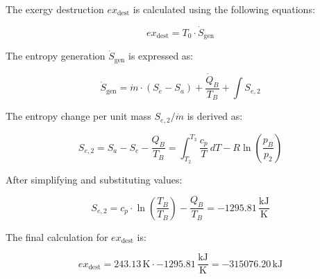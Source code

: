 The exergy destruction \( ex_{\text{dest}} \) is calculated using the following equations:

\[
ex_{\text{dest}} = T_0 \cdot \dot{S}_{\text{gen}}
\]

The entropy generation \( \dot{S}_{\text{gen}} \) is expressed as:

\[
\dot{S}_{\text{gen}} = \dot{m} \cdot (S_e - S_a) + \frac{\dot{Q}_B}{T_B} + \int S_{e,2}
\]

The entropy change per unit mass \( S_{e,2} / \dot{m} \) is derived as:

\[
S_{e,2} = S_a - S_e - \frac{Q_B}{T_B} = \int_{T_2}^{T_3} \frac{c_p}{T} \, dT - R \ln\left(\frac{p_B}{p_2}\right)
\]

After simplifying and substituting values:

\[
S_{e,2} = c_p \cdot \ln\left(\frac{T_B}{T_B}\right) - \frac{Q_B}{T_B} = -1295.81 \, \frac{\text{kJ}}{\text{K}}
\]

The final calculation for \( ex_{\text{dest}} \) is:

\[
ex_{\text{dest}} = 243.13 \, \text{K} \cdot -1295.81 \, \frac{\text{kJ}}{\text{K}} = -315076.20 \, \text{kJ}
\]